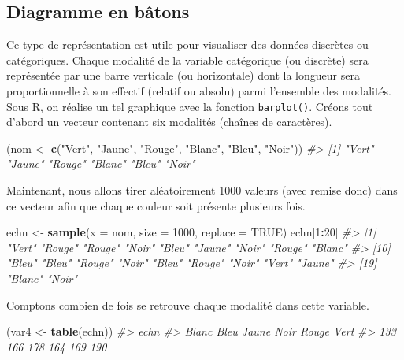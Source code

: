 \documentclass[]{article}
\newenvironment{Shaded}{\begin{snugshade}}{\end{snugshade}}
\newcommand{\CommentTok}[1]{\textcolor[rgb]{0.56,0.35,0.01}{\textit{#1}}}
\newcommand{\DataTypeTok}[1]{\textcolor[rgb]{0.13,0.29,0.53}{#1}}
\newcommand{\DecValTok}[1]{\textcolor[rgb]{0.00,0.00,0.81}{#1}}
\newcommand{\KeywordTok}[1]{\textcolor[rgb]{0.13,0.29,0.53}{\textbf{#1}}}
\newcommand{\NormalTok}[1]{#1}
\newcommand{\OperatorTok}[1]{\textcolor[rgb]{0.81,0.36,0.00}{\textbf{#1}}}
\newcommand{\OtherTok}[1]{\textcolor[rgb]{0.56,0.35,0.01}{#1}}
\newcommand{\StringTok}[1]{\textcolor[rgb]{0.31,0.60,0.02}{#1}}
\begin{document}
\hypertarget{diagramme-en-buxe2tons}{%
\subsection{Diagramme en bâtons}\label{diagramme-en-buxe2tons}}

Ce type de représentation est utile pour visualiser des données discrètes ou catégoriques. Chaque modalité de la variable catégorique (ou discrète) sera représentée par une barre verticale (ou horizontale) dont la longueur sera proportionnelle à son effectif (relatif ou absolu) parmi l'ensemble des modalités. Sous R, on réalise un tel graphique avec la fonction \texttt{barplot()}.
Créons tout d'abord un vecteur contenant six modalités (chaînes de caractères).

\begin{Shaded}
\begin{Highlighting}[]
\NormalTok{(nom <-}\StringTok{ }\KeywordTok{c}\NormalTok{(}\StringTok{"Vert"}\NormalTok{, }\StringTok{"Jaune"}\NormalTok{, }\StringTok{"Rouge"}\NormalTok{, }\StringTok{"Blanc"}\NormalTok{, }\StringTok{"Bleu"}\NormalTok{, }\StringTok{"Noir"}\NormalTok{))}
\CommentTok{#> [1] "Vert"  "Jaune" "Rouge" "Blanc" "Bleu"  "Noir"}
\end{Highlighting}
\end{Shaded}

Maintenant, nous allons tirer aléatoirement 1000 valeurs (avec remise donc) dans ce vecteur afin que chaque couleur soit présente plusieurs fois.

\begin{Shaded}
\begin{Highlighting}[]
\NormalTok{echn <-}\StringTok{ }\KeywordTok{sample}\NormalTok{(}\DataTypeTok{x =}\NormalTok{ nom, }\DataTypeTok{size =} \DecValTok{1000}\NormalTok{, }\DataTypeTok{replace =} \OtherTok{TRUE}\NormalTok{)}
\NormalTok{echn[}\DecValTok{1}\OperatorTok{:}\DecValTok{20}\NormalTok{]}
\CommentTok{#>  [1] "Vert"  "Rouge" "Rouge" "Noir"  "Bleu"  "Jaune" "Noir"  "Rouge" "Blanc"}
\CommentTok{#> [10] "Bleu"  "Bleu"  "Rouge" "Noir"  "Bleu"  "Rouge" "Noir"  "Vert"  "Jaune"}
\CommentTok{#> [19] "Blanc" "Noir"}
\end{Highlighting}
\end{Shaded}

Comptons combien de fois se retrouve chaque modalité dans cette variable.

\begin{Shaded}
\begin{Highlighting}[]
\NormalTok{(var4 <-}\StringTok{ }\KeywordTok{table}\NormalTok{(echn))}
\CommentTok{#> echn}
\CommentTok{#> Blanc  Bleu Jaune  Noir Rouge  Vert }
\CommentTok{#>   133   166   178   164   169   190}
\end{Highlighting}
\end{Shaded}
\end{document}
